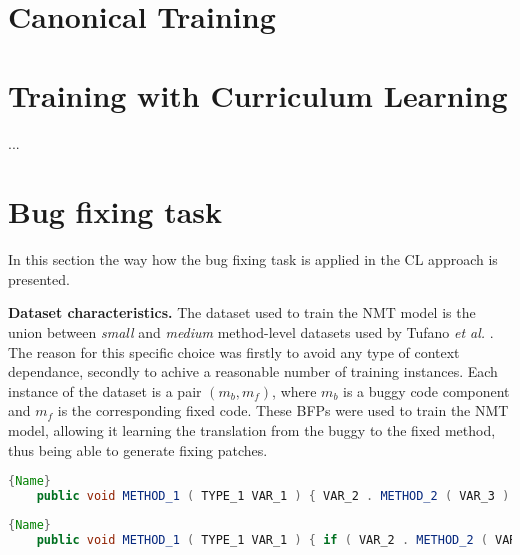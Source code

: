 \section{Canonical Training}



\section{Training with Curriculum Learning}

...

\section{Bug fixing task}
In this section the way how the bug fixing task is applied in the CL approach is presented.

\textbf{Dataset characteristics.} The dataset used to train the NMT model is the union between \textit{small} and \textit{medium} method-level datasets
used by Tufano \textit{et al.} \cite{Tufano2019}. The reason for this specific choice was firstly
to avoid any type of context dependance, secondly to achive a reasonable number of training instances.
Each instance of the dataset is a pair $(m_b, m_f)$, where $m_b$ is a buggy code component and $m_f$ is the
corresponding fixed code. These BFPs were used to train the NMT model, allowing it learning the translation
from the buggy to the fixed method, thus being able to generate fixing patches.

\begin{lstlisting}[language=Java, caption={Buggy code},label={lst:buggy1}, mathescape=true, breaklines=true]{Name}   
    public void METHOD_1 ( TYPE_1 VAR_1 ) { VAR_2 . METHOD_2 ( VAR_3 ) ; ( VAR_4 ) ++ ; METHOD_3 ( ) ; } 
\end{lstlisting}


\begin{lstlisting}[language=Java, caption={Fixed code},label={lst:fixed1}, mathescape=true, breaklines=true]{Name}
    public void METHOD_1 ( TYPE_1 VAR_1 ) { if ( VAR_2 . METHOD_2 ( VAR_3 ) ) { ( VAR_4 ) ++ ; METHOD_3 ( ) ; } }
\end{lstlisting}


